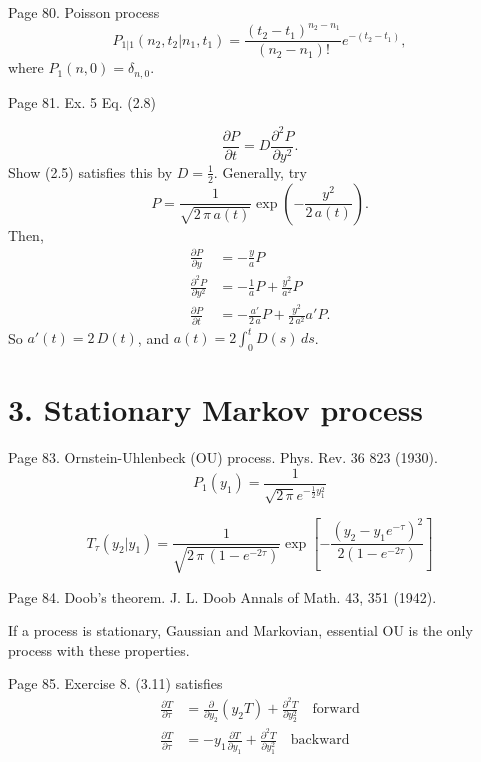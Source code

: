\documentclass{book}
\begin{document}
Page 80.
Poisson process
\begin{equation}
P_{1|1}(n_2, t_2|n_1, t_1)
=
\frac{ (t_2 - t_1)^{n_2 - n_1} } { (n_2 - n_1)! }
e^{ -(t_2 - t_1) },
\tag{2.6}
\end{equation}
where
$P_1(n, 0) = \delta_{n,0}$.

Page 81. Ex. 5 Eq. (2.8)

$$
\frac{ \partial P } { \partial t }
=
D \frac{ \partial^2 P } { \partial y^2 }.
$$
Show (2.5) satisfies this by $D = \frac{1}{2}$.
Generally, try
$$
P = \frac{ 1 } { \sqrt{ 2 \, \pi \, a(t) } }
\exp\left(
  - \frac{ y^2 } { 2 \, a(t) }
\right).
$$
Then,
$$
\begin{aligned}
\frac{ \partial P } { \partial y }
&=
- \frac{ y } { a } P
\\
\frac{ \partial^2 P } { \partial y^2 }
&=
- \frac{1}{a} P
+ \frac{ y^2 } { a^2 } P
\\
\frac{ \partial P } { \partial t }
&=
-\frac{ a' } { 2 \, a } P
+ \frac{ y^2 } { 2 \, a^2 } a' P.
\end{aligned}
$$
So $a'(t) = 2 \, D(t)$,
and
$a(t) = 2 \int^t_0 D(s) \, ds$.


\section{3. Stationary Markov process}

Page 83.
Ornstein-Uhlenbeck (OU) process.
Phys. Rev. 36 823 (1930).
\begin{equation}
P_1(y_1)
=
\frac{1}{\sqrt{2 \, \pi} e^{-\frac 1 2 y_1^2 } }
\tag{3.10}
\end{equation}

\begin{equation}
  T_\tau(y_2 | y_1)
=
\frac{ 1 } { \sqrt{ 2 \, \pi \, (1 - e^{-2\tau}) }  }
\exp\left[
  -\frac{ (y_2 - y_1 e^{-\tau})^2 }
  { 2 ( 1 - e^{-2 \tau } ) }
\right]
\tag{3.11}
\end{equation}

Page 84.
Doob's theorem.
J. L. Doob Annals of Math. 43, 351 (1942).

If a process is stationary, Gaussian and Markovian,
essential OU is the only process with these properties.

Page 85.
Exercise 8. (3.11) satisfies
\begin{align}
\frac{ \partial T } { \partial \tau }
&=
\frac{ \partial } { \partial y_2 } \left( y_2 T \right)
+
\frac{ \partial^2 T } { \partial y_2^2 }
\quad \mathrm{forward}
\tag{3.20}
\\
\frac{ \partial T } { \partial \tau }
&=
-y_1 \frac{ \partial T } { \partial y_1 }
+
\frac{ \partial^2 T } { \partial y_1^2 }
\quad \mathrm{backward}
\tag{3.21}
\end{align}
\end{document}

